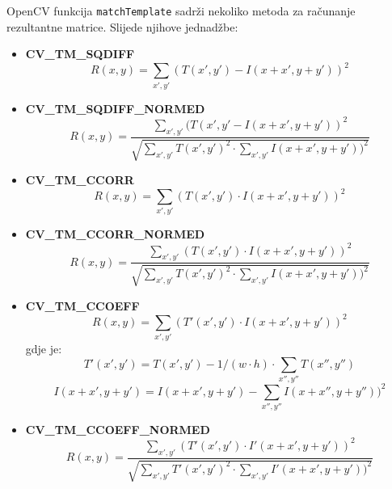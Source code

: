 OpenCV funkcija \texttt{matchTemplate} sadrži nekoliko metoda za
računanje rezultantne matrice. Slijede njihove jednadžbe:
\begin{itemize}
    \item \textbf{CV\_TM\_SQDIFF} 
    \begin{equation}
         R\left ( x,y \right )= \sum_{{x}',{y}'} (T({x}',{y}')-I\left ( x+{x}',y+{y}' \right ))^{2}
	\end{equation}
    \item \textbf{CV\_TM\_SQDIFF\_NORMED} 
    \begin{equation}
     R\left ( x,y \right )= \frac{\sum_{{x}',{y}'}(T({x}',{y}' - I\left ( x+{x}',y+{y}' \right ))^{2}}{\sqrt{\sum_{{x}',{y}'}T({x}',{y}')^{2}\cdot \sum_{{x}',{y}'}I\left ( x+{x}',y+{y}' \right ))^{2}}}
    \end{equation}
    \item \textbf{CV\_TM\_CCORR} 
    \begin{equation}
     R\left ( x,y \right )= \sum_{{x}',{y}'} (T({x}',{y}')\cdot I\left ( x+{x}',y+{y}' \right ))^{2}
    \end{equation}
    \item \textbf{CV\_TM\_CCORR\_NORMED} 
    \begin{equation}
     R\left ( x,y \right ) = \frac{\sum_{{x}',{y}'}(T({x}',{y}')\cdot I\left ( x+{x}',y+{y}' \right ))^{2}}{\sqrt{\sum_{{x}',{y}'}T({x}',{y}')^{2}\cdot \sum_{{x}',{y}'}I\left ( x+{x}',y+{y}' \right ))^{2}}}
    \end{equation}
    \item \textbf{CV\_TM\_CCOEFF} 
     \begin{equation}
      R\left ( x,y \right )= \sum_{{x}',{y}'} ({T}'({x}',{y}')\cdot I\left ( x+{x}',y+{y}' \right ))^{2}
     \end{equation}
     gdje je:
    \begin{equation}
     {T}'({x}',{y}')=T({x}',{y}')-1/(w\cdot h)\cdot \sum_{{x}'',{y}''}T({x}'',{y}'')
    \end{equation}
    \begin{equation}
      I\left ( x+{x}',y+{y}' \right )=I\left ( x+{x}',y+{y}' \right )- \sum_{{x}'',{y}''}I\left ( x+{x}'',y+{y}'' \right ))^{2}
      \end{equation}
    \item \textbf{CV\_TM\_CCOEFF\_NORMED} 
    \begin{equation}
      R\left ( x,y \right )= \frac{ \sum_{{x}',{y}'}({T}'({x}',{y}')\cdot {I}'\left ( x+{x}',y+{y}' \right ))^{2}}{\sqrt{\sum_{{x}',{y}'}{T}'({x}',{y}')^{2}\cdot \sum_{{x}',{y}'}{I}'\left ( x+{x}',y+{y}' \right ))^{2}}}
    \end{equation}
\end{itemize}


